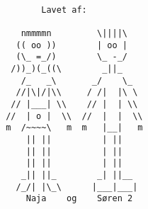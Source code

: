\documentclass[10pt,a4paper,danish]{article}
\begin{document}
\begin{verbatim}

        Lavet af:

    nmmmmn         \||||\
   (( oo ))        | oo |
   (\_ =_/)        \_ -_/
  /))_)(_((\        _||_
    /_   _\       _/    \_
   //|\|/|\\     / /|  |\ \
  // |___| \\    // |  | \\
 //  | o |  \\  //  |  |  \\
 m  /~~~~\   m  m   |__|   m
     || ||          | ||  
     || ||          | ||  
     || ||          | ||  
    _|| ||_        _| ||__
   /_/| |\_\      |___|___|
     Naja    og    Søren 2

\end{verbatim}
\end{document}
